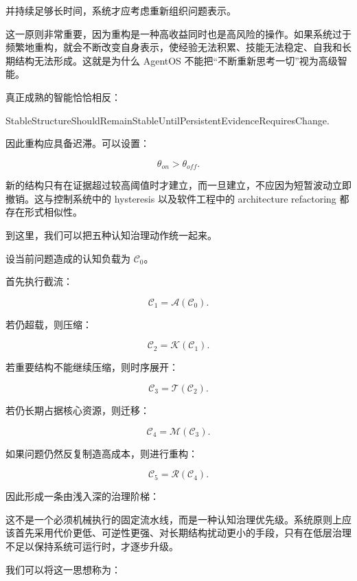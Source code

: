 并持续足够长时间，系统才应考虑重新组织问题表示。

这一原则非常重要，因为重构是一种高收益同时也是高风险的操作。如果系统过于频繁地重构，就会不断改变自身表示，使经验无法积累、技能无法稳定、自我和长期结构无法形成。这就是为什么 AgentOS 不能把“不断重新思考一切”视为高级智能。

真正成熟的智能恰恰相反：

\begin{statementbox}
StableStructureShouldRemainStableUntilPersistentEvidenceRequiresChange.
\end{statementbox}

因此重构应具备迟滞。可以设置：

\[
\theta_{on}
>
\theta_{off}.
\]

新的结构只有在证据超过较高阈值时才建立，而一旦建立，不应因为短暂波动立即撤销。这与控制系统中的 hysteresis 以及软件工程中的 architecture refactoring 都存在形式相似性。

到这里，我们可以把五种认知治理动作统一起来。

设当前问题造成的认知负载为 $\mathcal C_0$。

首先执行截流：

\[
\mathcal C_1
=
\mathcal A(\mathcal C_0).
\]

若仍超载，则压缩：

\[
\mathcal C_2
=
\mathcal K(\mathcal C_1).
\]

若重要结构不能继续压缩，则时序展开：

\[
\mathcal C_3
=
\mathcal T(\mathcal C_2).
\]

若仍长期占据核心资源，则迁移：

\[
\mathcal C_4
=
\mathcal M(\mathcal C_3).
\]

如果问题仍然反复制造高成本，则进行重构：

\[
\mathcal C_5
=
\mathcal R(\mathcal C_4).
\]

因此形成一条由浅入深的治理阶梯：

\begin{statementbox}
\centering
{}
\end{statementbox}

这不是一个必须机械执行的固定流水线，而是一种认知治理优先级。系统原则上应该首先采用代价更低、可逆性更强、对长期结构扰动更小的手段，只有在低层治理不足以保持系统可运行时，才逐步升级。

我们可以将这一思想称为：

